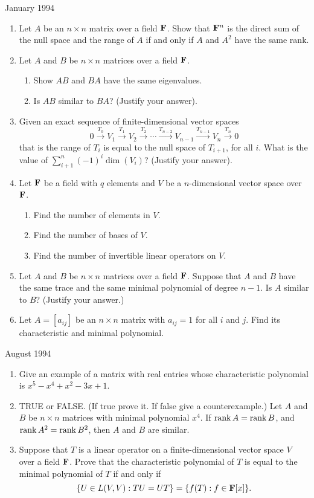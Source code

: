 \documentclass[11pt]{amsart}
\renewcommand{\(}{\left(}
\renewcommand{\)}{\right)}
\renewcommand{\[}{\left[}
\renewcommand{\]}{\right]}
\newcommand{\heading}[1]{\centerline{\large\sc #1}}
\newcommand{\num}{\begin{enumerate}}
\newcommand{\enum}{\end{enumerate}}
\newcommand{\fe}{{\bf F}}
\begin{document}
\heading{January 1994}
\num
\item Let $A$ be an $n\times n$ matrix over a field $\fe$.  Show that
$\fe^n$ is the direct sum of the null space and the range of $A$ if
and only if $A$ and $A^2$ have the same rank.
\item Let $A$ and $B$ be $n\times n$ matrices over a field $\fe$.
\num
\item Show $AB$ and $BA$ have the same eigenvalues.
\item Is $AB$ similar to $BA$?  (Justify your answer).
\enum
\item Given an exact sequence of finite-dimensional vector spaces 
$$
0 \stackrel{T_0}{\longrightarrow} V_1
 \stackrel{T_1}{\longrightarrow} V_2
\stackrel{T_2}{\longrightarrow}
 \cdots 
\stackrel{T_{n-2}}{\longrightarrow} V_{n-1}
\stackrel{T_{n-1}}{\longrightarrow} V_{n}
\stackrel{T_{n}}{\longrightarrow}0
$$
that is the range of $T_i$ is equal to the null space of $T_{i+1}$,
for all $i$.  What is the value of $\displaystyle
\sum_{i+1}^n(-1)^i\dim(V_i)$? (Justify your answer).
\item Let $\fe$ be a field with $q$ elements and $V$ be a
$n$-dimensional vector space over $\fe$.
\num
\item Find the number of elements in $V$.
\item Find the number of bases of $V$.
\item Find the number of invertible linear operators on $V$.
\enum
\item Let $A$ and $B$ be $n\times n$ matrices over a field $\fe$.
Suppose that $A$ and $B$ have the same trace and the same minimal
polynomial of degree $n-1$.  Is $A$ similar to $B$?  (Justify your
answer.)
\item Let $A=[a_{ij}]$ be an $n\times n$ matrix with $a_{ij}=1$ for
all $i$ and $j$.  Find its characteristic and minimal polynomial.

\enum

\heading{August 1994}

\num
\item Give an example of a matrix with real entries whose
characteristic polynomial is $x^5-x^4+x^2-3x+1$.
\item TRUE or FALSE. (If true prove it.  If false give a
counterexample.) Let $A$ and $B$ be $n\times n$ matrices with minimal
polynomial $x^4$.  If $\mathop{\rm rank} A=\mathop{\rm rank}B$, and 
$\mathop{\rm rank}A^2=\mathop{\rm rank}B^2$, then $A$ and $B$ are
similar.
\item Suppose that $T$ is a linear operator on a finite-dimensional
vector space $V$ over a field $\fe$.  Prove that the characteristic
polynomial of $T$ is equal to the minimal polynomial of $T$ if and
only if
$$
\{U\in L(V,V):TU=UT\}=\{f(T):f\in \fe[x]\}.
$$
\enum
\end{document}
